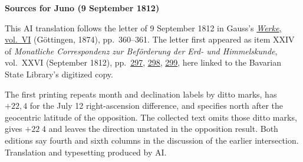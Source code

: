 \clearpage\thispagestyle{empty}
\begin{center}\textbf{Sources for Juno (9 September 1812)}\end{center}
\noindent This AI translation follows the letter of 9 September 1812 in Gauss’s \href{https://gdz.sub.uni-goettingen.de/id/PPN236007467}{\textit{Werke}, vol.~VI} (Göttingen, 1874), pp.~360--361. The letter first appeared as item XXIV of \textit{Monatliche Correspondenz zur Beförderung der Erd- und Himmelskunde}, vol.~XXVI (September 1812), pp.~\href{https://api.digitale-sammlungen.de/iiif/image/v2/bsb10538615_00307/full/1600,/0/default.jpg}{297}, \href{https://api.digitale-sammlungen.de/iiif/image/v2/bsb10538615_00308/full/1600,/0/default.jpg}{298}, \href{https://api.digitale-sammlungen.de/iiif/image/v2/bsb10538615_00309/full/1600,/0/default.jpg}{299}, here linked to the Bavarian State Library’s digitized copy.
\par\smallskip\noindent The first printing repeats month and declination labels by ditto marks, has $+22{,}4$ for the July 12 right-ascension difference, and specifies north after the geocentric latitude of the opposition. The collected text omits those ditto marks, gives $+22\;4$ and leaves the direction unstated in the opposition result. Both editions say fourth and sixth columns in the discussion of the earlier intersection. Translation and typesetting produced by AI.
\clearpage

